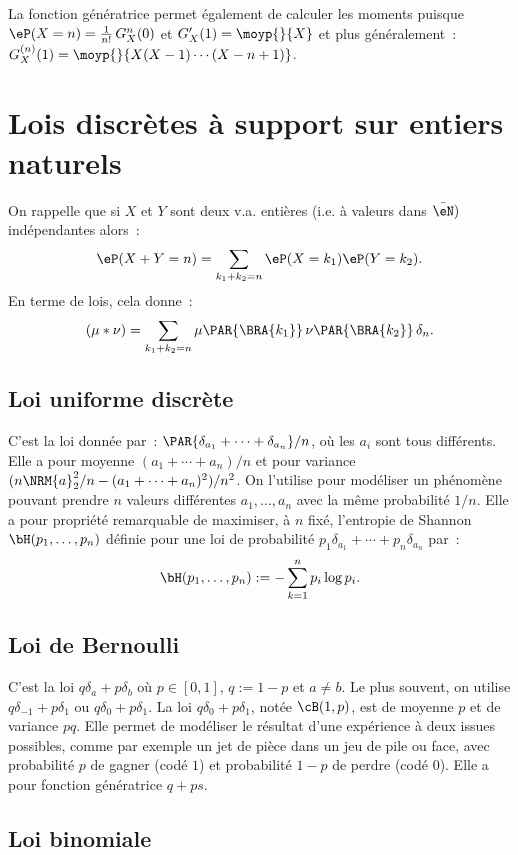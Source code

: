 La fonction génératrice permet également de calculer les moments puisque
$\eP(X=n)=\frac{1}{n!}\,G^{n}_X(0)$ et $G_X'(1)=\moyp{}{X}$ et plus
généralement~: $G_X^{(n)}(1)=\moyp{}{X(X-1)\cdots(X-n+1)}$.


%
\section{Lois discrètes à support sur entiers naturels}
%

On rappelle que si $X$ et $Y$ sont deux v.a. entières (i.e. à valeurs dans
$\bar{\eN})$ indépendantes alors~:
$$
\eP(X+Y=n)=\sum_{k_1+k_2=n}\eP(X=k_1)\eP(Y=k_2).
$$
En terme de lois, cela donne~:
$$
(\mu*\nu)=\sum_{k_1+k_2=n}\mu\PAR{\BRA{k_1}}\,\nu\PAR{\BRA{k_2}}\,\delta_n.
$$

%
\subsection{Loi uniforme discrète}\label{ss:loi:uniforme-discrete}
%

C'est la loi donnée par~: $\PAR{\delta_{a_1}+\cdots+\delta_{a_n}}/n$, où les $a_i$ sont
tous différents. Elle a pour moyenne $(a_1+\cdots+a_n)/n$ et pour variance
$(n\NRM{a}_2^2/n-(a_1+\cdots+a_n)^2)/n^2$. On l'utilise pour modéliser un phénomène
pouvant prendre $n$ valeurs différentes $a_1,\ldots,a_n$ avec la même probabilité
$1/n$. Elle a pour propriété remarquable de maximiser, à $n$ fixé, l'entropie
de Shannon $\bH(p_1,\ldots,p_n)$ définie pour une loi de probabilité
$p_1\delta_{a_1}+\cdots+p_n\delta_{a_n}$ par~:
$$
\bH(p_1,\ldots,p_n):=-\sum_{k=1}^n p_i\log p_i.
$$

%
\subsection{Loi de Bernoulli}\label{ss:loi:bernoulli}
%

C'est la loi $q\delta_a+p\delta_b$ où $p\in[0,1]$, $q:=1-p$ et $a\neq b$. Le plus
souvent, on utilise $q\delta_{-1}+p\delta_1$ ou $q\delta_0+p\delta_1$.  La loi
$q\delta_0+p\delta_1$, notée $\cB(1,p)$, est de moyenne $p$ et de variance $pq$.
Elle permet de modéliser le résultat d'une expérience à deux issues possibles,
comme par exemple un jet de pièce dans un jeu de pile ou face, avec
probabilité $p$ de gagner (codé $1$) et probabilité $1-p$ de perdre (codé
$0$). Elle a pour fonction génératrice $q+ps$.

%
\subsection{Loi binomiale}\label{ss:loi:binomiale}
%

